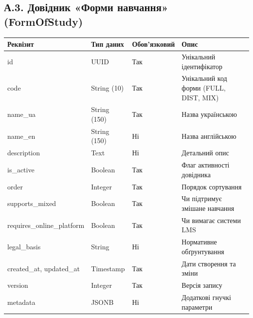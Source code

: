 \documentclass{article}
\begin{document}
\begin{appendix}
\subsection{А.3. Довідник «Форми навчання» (FormOfStudy)}
\begin{longtable}{p{3.5cm}p{3cm}p{2cm}p{5.5cm}}
\toprule
\textbf{Реквізит} & \textbf{Тип даних} & \textbf{Обов'язковий} & \textbf{Опис} \\
\midrule
id & UUID & Так & Унікальний ідентифікатор \\
code & String (10) & Так & Унікальний код форми (FULL, DIST, MIX) \\
name\_ua & String (150) & Так & Назва українською \\
name\_en & String (150) & Ні & Назва англійською \\
description & Text & Ні & Детальний опис \\
is\_active & Boolean & Так & Флаг активності довідника \\
order & Integer & Так & Порядок сортування \\
supports\_mixed & Boolean & Так & Чи підтримує змішане навчання \\
requires\_online\_platform& Boolean & Так & Чи вимагає системи LMS \\
legal\_basis & String & Ні & Нормативне обґрунтування \\
created\_at, updated\_at & Timestamp & Так & Дати створення та зміни \\
version & Integer & Так & Версія запису \\
metadata & JSONB & Ні & Додаткові гнучкі параметри \\
\bottomrule
\end{longtable}


\end{appendix}
\end{document}
